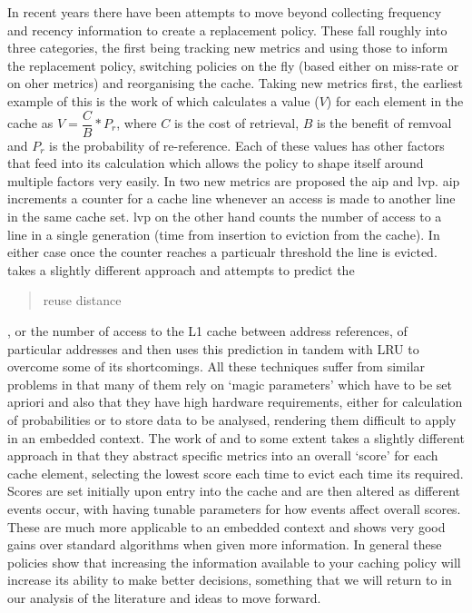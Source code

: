 In recent years there have been attempts to move beyond collecting frequency and recency information to create a replacement policy. These fall roughly into three categories, the first being tracking new metrics and using those to inform the replacement policy, switching policies on the fly (based either on miss-rate or on oher metrics) and reorganising the cache. Taking new metrics first, the earliest example of this is the work of  \citet{rizzoReplacementPoliciesProxy2000} which calculates a value ($V$) for each element in the cache as $V = \dfrac{C}{B}*P_r$, where $C$ is the cost of retrieval, $B$ is the benefit of remvoal and $P_r$ is the probability of re-reference. Each of these values has other factors that feed into its calculation which allows the policy to shape itself around multiple factors very easily. In \citet{kharbutliCounterbasedCacheReplacement2005} two new metrics are proposed the \gls{aip} and \gls{lvp}. \gls{aip} increments a counter for a cache line whenever an access is made to another line in the same cache set. \gls{lvp} on the other hand counts the number of access to a line in a single generation (time from insertion to eviction from the cache). In either case once the counter reaches a particualr threshold the line is evicted. \citet{keramidasCacheReplacementBased2007} takes a slightly different approach and attempts to predict the \blockcquote{keramidasCacheReplacementBased2007}{reuse distance}, or the number of access to the L1 cache between address references, of particular addresses and then uses this prediction in tandem with LRU to overcome some of its shortcomings. All these techniques suffer from similar problems in that many of them rely on `magic parameters' which have to be set apriori and also that they have high hardware requirements, either for calculation of probabilities or to store data to be analysed, rendering them difficult to apply in an embedded context. The work of \citet{duongSCOREScoreBasedMemory2010} and to some extent \citet{tadaCacheReplacementPolicy2019} takes a slightly different approach in that they abstract specific metrics into an overall `score' for each cache element, selecting the lowest score each time to evict each time its required. Scores are set initially upon entry into the cache and are then altered as different events occur, with \citet{duongSCOREScoreBasedMemory2010} having tunable parameters for how events affect overall scores. These are much more applicable to an embedded context and shows very good gains over standard algorithms when given more information. In general these policies show that increasing the information available to your caching policy will increase its ability to make better decisions, something that we will return to in our analysis of the literature and ideas to move forward.

